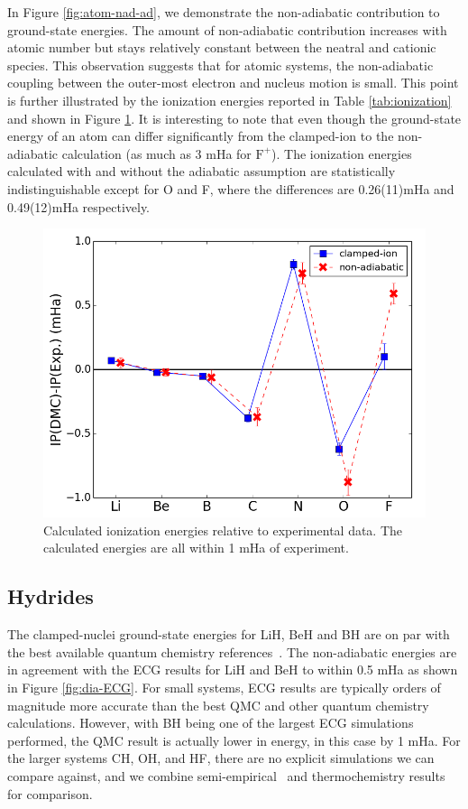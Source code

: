 \documentclass[pra,superscriptaddress,groupedaddress,twocolumn]{revtex4}
\begin{document}
In Figure \ref{fig:atom-nad-ad}, we demonstrate the non-adiabatic contribution to ground-state energies. The amount of non-adiabatic contribution increases with atomic number but stays relatively constant between the neatral and cationic species. This observation suggests that for atomic systems, the non-adiabatic coupling between the outer-most electron and nucleus motion is small. This point is further illustrated by the ionization energies reported in Table \ref{tab:ionization} and shown in Figure \ref{fig:ionization}. It is interesting to note that even though the ground-state energy of an atom can differ significantly from the clamped-ion to the non-adiabatic calculation (as much as 3 mHa for $\text{F}^+$). The ionization energies calculated with and without the adiabatic assumption are statistically indistinguishable except for O and F, where the differences are 0.26(11)mHa and 0.49(12)mHa respectively.

\begin{figure}
\centering
\includegraphics[scale=.4]{Figures/ionization}
\caption{Calculated ionization energies relative to experimental data. The calculated energies are all within 1 mHa of experiment. \label{fig:ionization}}
\end{figure}

\subsection{Hydrides}

The clamped-nuclei ground-state energies for LiH, BeH and BH are on par with the best available quantum chemistry references~\cite{Adamowicz_LiH,Koput_BeH,Miliordos_BH}. The non-adiabatic energies are in agreement with the ECG results for LiH and BeH to within 0.5 mHa as shown in Figure \ref{fig:dia-ECG}. For small systems, ECG results are typically orders of magnitude more accurate than the best QMC and other quantum chemistry calculations. However, with BH being one of the largest ECG simulations performed, the QMC result is actually lower in energy, in this case by 1 mHa. For the larger systems CH, OH, and HF, there are no explicit simulations we can compare against, and we combine semi-empirical~\cite{Davidson_Atoms} and thermochemistry results~\cite{Feller_Corrections} for comparison.
\end{document}
